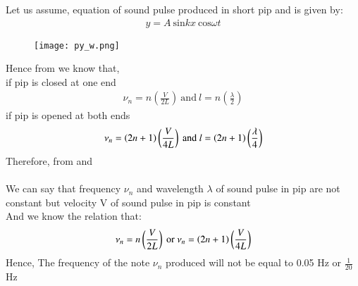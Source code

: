 \documentclass[beamer]{IEEEtran}
\theoremstyle{remark}
\begin{document}
 Let us assume, equation of sound pulse  produced in short pip and is given by:\\
\begin{align}
    \label{a1}
    y=A\ \text{sin}kx\ \text{cos}\omega t
\end{align}
\begin{figure}[h]
    \centering
    \texttt{[image: py\_w.png]}
    \label{fig:enter-label}
\end{figure}

Hence from \brak{\ref{a1}} we know that,\\
if pip is closed at one end\\
\begin{align}
\label{a2}
\nu_n=n\left(\frac{V}{2L}\right)\ \text{and}\ l=n\left(\frac{\lambda}{2}\right)
\end{align}
if pip is opened at both ends\\
\begin{align}
\label{a3}
\nu_n=\brak{2n+1}\left(\frac{V}{4L}\right)\ \text{and}\ l=\brak{2n+1}\left(\frac{\lambda}{4}\right)
\end{align}
Therefore, from \brak{\ref{a2}} and \brak{\ref{a3}}\\\\
We can say that frequency $\nu_n$ and wavelength $\lambda$ of sound pulse in pip are not constant but velocity V of sound pulse in pip is constant\\

 And we know the relation that:
\begin{align}
    \label{a4}
    \nu_n=n\left(\frac{V}{2L}\right)\ \text{or}\ \nu_n=\brak{2n+1}\left(\frac{V}{4L}\right)
\end{align}
Hence, The frequency of the note $\nu_n$ produced will not be equal to 0.05 Hz or $\frac{1}{20}$ Hz 
\end{document}
